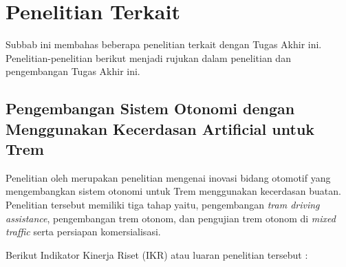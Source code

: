 \section{Penelitian Terkait}

Subbab ini membahas beberapa penelitian terkait dengan Tugas Akhir ini.
Penelitian-penelitian berikut menjadi rujukan dalam penelitian dan pengembangan
Tugas Akhir ini.

\subsection{Pengembangan Sistem Otonomi dengan Menggunakan Kecerdasan Artificial untuk Trem}
\label{subsec:rispro-trilaksono}

Penelitian oleh \cite{rispro-trilaksono} merupakan penelitian mengenai inovasi
bidang otomotif yang mengembangkan sistem otonomi untuk Trem menggunakan
kecerdasan buatan. Penelitian tersebut memiliki tiga tahap yaitu, pengembangan
\textit{tram driving assistance}, pengembangan trem otonom, dan pengujian trem
otonom di \textit{mixed traffic} serta persiapan komersialisasi.

Berikut Indikator Kinerja Riset (IKR) atau luaran penelitian tersebut
\parencite{rispro-trilaksono}:

